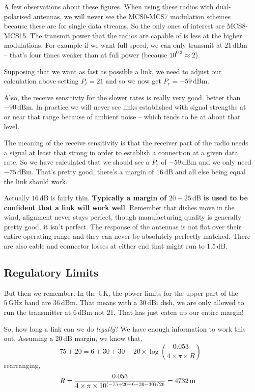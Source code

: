 A few observations about these figures. When using these radios with
dual-polarised antennas, we will never see the MCS0-MCS7 modulation
schemes because these are for single data streams. So the only ones of
interest are MCS8-MCS15. The transmit power that the radios are
capable of is less at the higher modulations. For example if we want
full speed, we can only transmit at $21\, \mathrm{dBm}$ -- that's four
times weaker than at full power (because $10^{0.3} \approx 2$). 

Supposing that we want as fast as possible a link, we need to adjust
our calculation above setting $P_t = 21$ and so we now get
$P_r = -59\, \mathrm{dBm}$.

Also, the receive sensitivty for the slower rates is really very good,
better than $-90\, \mathrm{dBm}$. In practice we will never see links
established with signal strengths at or near that range because of
ambient noise -- which tends to be at about that level.

The meaning of the receive sensitivity is that the receiver part of
the radio needs a signal at least that strong in order to establish a
connection at a given data rate. So we have calculated that we should
see a $P_r$ of $-59\, \mathrm{dBm}$ and we only need $-75\, \mathrm{dBm}$.
That's pretty good, there's a margin of $16\, \mathrm{dB}$ and all
else being equal the link should work.

Actually $16\, \mathrm{dB}$ is fairly thin. \textbf{Typically a margin
  of $20-25\, \mathrm{dB}$ is used to be confident that a link will
  work well}. Remember that dishes move in the wind, alignment never
stays perfect, though manufacturing quality is generally pretty good,
it isn't perfect. The response of the antennas is not flat over their
entire operating range and they can never be absolutely perfectly
matched. There are also cable and connector losses at either end that
might run to $1.5\, \mathrm{dB}$.

\subsection{Regulatory Limits}

But then we remember. In the UK, the power limits for the upper part
of the $5\,\mathrm{GHz}$ band are $36\, \mathrm{dBm}$. That means with
a $30\, \mathrm{dBi}$ dish, we are only allowed to run the transmitter
at $6\, \mathrm{dBm}$ not $21$. That has just eaten up our entire
margin!

So, how long a link can we do \textit{legally}? We have enough
information to work this out. Assuming a $20\, \mathrm{dB}$ margin, we
know that,
$$
-75 + 20 = 6 + 30 + 30 + 20 \times
\log \left(\frac{0.053}{4 \times \pi \times R} \right)
$$
rearranging,
$$
R = \frac{%
  0.053
}{%
  4 \times \pi \times 10^{\left(-75 + 20 - 6 - 30 - 30\right)/20}%
} = 4732\, \mathrm{m}
$$


